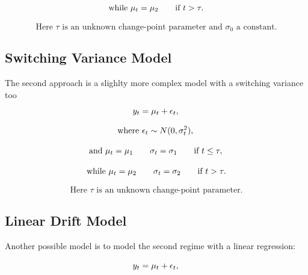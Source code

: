 \documentclass[12pt, titlepage]{article}
\begin{document}
\begin{displaymath}
 \text{while } \mu_t = \mu_2 \qquad \text{if } t > \tau.\\
\end{displaymath}

\begin{displaymath}
 \text{Here } \tau \text{ is an unknown change-point parameter and } \sigma_0 \text{ a constant.}
\end{displaymath}






\subsection{Switching Variance Model}

The second approach is a slighlty more complex model with a switching variance too
\begin{displaymath}
 y_t = \mu_t + \epsilon_t, \\ 
\end{displaymath}

\begin{displaymath}
 \text{where } \epsilon_t \sim {N}(0,\sigma_t^2), \\
\end{displaymath}

\begin{displaymath}
 \text{and }  \mu_t = \mu_1 \qquad \sigma_t = \sigma_1 \qquad \text{if } t \leq \tau, \\
\end{displaymath}

\begin{displaymath}
 \text{while } \mu_t = \mu_2 \qquad \sigma_t = \sigma_2 \qquad \text{if } t > \tau.\\
\end{displaymath}

\begin{displaymath}
 \text{Here } \tau \text{ is an unknown change-point parameter.}
\end{displaymath}

\subsection{Linear Drift Model}

Another possible model is to model the second regime with a linear regression: 

\begin{displaymath}
 y_t = \mu_t + \epsilon_t, \\ 
\end{displaymath}
\end{document}
